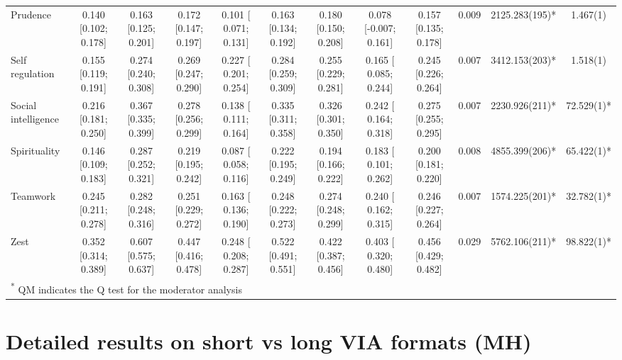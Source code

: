 \documentclass[
  man,floatsintext]{apa6}
\begin{document}
\begin{table}
{\begin{tabular}[t]{lccccccccccc}
Prudence & 0.140 [0.102; 0.178] & 0.163 [0.125; 0.201] & 0.172 [0.147; 0.197] & 0.101 [ 0.071; 0.131] & 0.163 [0.134; 0.192] & 0.180 [0.150; 0.208] & 0.078 [-0.007; 0.161] & 0.157 [0.135; 0.178] & 0.009 & 2125.283(195)* & 1.467(1)\\
Self regulation & 0.155 [0.119; 0.191] & 0.274 [0.240; 0.308] & 0.269 [0.247; 0.290] & 0.227 [ 0.201; 0.254] & 0.284 [0.259; 0.309] & 0.255 [0.229; 0.281] & 0.165 [ 0.085; 0.244] & 0.245 [0.226; 0.264] & 0.007 & 3412.153(203)* & 1.518(1)\\
\addlinespace
Social intelligence & 0.216 [0.181; 0.250] & 0.367 [0.335; 0.399] & 0.278 [0.256; 0.299] & 0.138 [ 0.111; 0.164] & 0.335 [0.311; 0.358] & 0.326 [0.301; 0.350] & 0.242 [ 0.164; 0.318] & 0.275 [0.255; 0.295] & 0.007 & 2230.926(211)* & 72.529(1)*\\
Spirituality & 0.146 [0.109; 0.183] & 0.287 [0.252; 0.321] & 0.219 [0.195; 0.242] & 0.087 [ 0.058; 0.116] & 0.222 [0.195; 0.249] & 0.194 [0.166; 0.222] & 0.183 [ 0.101; 0.262] & 0.200 [0.181; 0.220] & 0.008 & 4855.399(206)* & 65.422(1)*\\
Teamwork & 0.245 [0.211; 0.278] & 0.282 [0.248; 0.316] & 0.251 [0.229; 0.272] & 0.163 [ 0.136; 0.190] & 0.248 [0.222; 0.273] & 0.274 [0.248; 0.299] & 0.240 [ 0.162; 0.315] & 0.246 [0.227; 0.264] & 0.007 & 1574.225(201)* & 32.782(1)*\\
Zest & 0.352 [0.314; 0.389] & 0.607 [0.575; 0.637] & 0.447 [0.416; 0.478] & 0.248 [ 0.208; 0.287] & 0.522 [0.491; 0.551] & 0.422 [0.387; 0.456] & 0.403 [ 0.320; 0.480] & 0.456 [0.429; 0.482] & 0.029 & 5762.106(211)* & 98.822(1)*\\
\bottomrule
\multicolumn{12}{l}{\textsuperscript{*} QM indicates the Q test for the moderator analysis}\\
\end{tabular}}
\end{table}

\newpage

\hypertarget{detailed-results-on-short-vs-long-via-formats-mh}{%
\section{Detailed results on short vs long VIA formats (MH)}\label{detailed-results-on-short-vs-long-via-formats-mh}}
\end{document}
